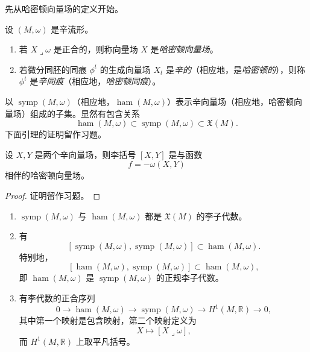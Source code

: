 先从哈密顿向量场的定义开始。

\begin{definition}
\label{def:hamiltonian-vector-field-isotopy}
设 $(M,\omega)$ 是辛流形。
\begin{enumerate}[label=(\arabic*)]
  \item 若 $X\mathbin{\lrcorner}\omega$ 是正合的，则称向量场 $X$ 是\emph{哈密顿向量场}。
  \item 若微分同胚的同痕 $\phi^t$ 的生成向量场 $X_t$ 是\emph{辛的}（相应地，是\emph{哈密顿的}），则称 $\phi^t$ 是\emph{辛同痕}（相应地，\emph{哈密顿同痕}）。
\end{enumerate}
\end{definition}

以 $\operatorname{symp}(M,\omega)$（相应地，$\operatorname{ham}(M,\omega)$）表示辛向量场（相应地，哈密顿向量场）组成的子集。显然有包含关系
\[
  \operatorname{ham}(M,\omega)
  \subset\operatorname{symp}(M,\omega)
  \subset\mathfrak X(M).
\]
下面引理的证明留作习题。

\begin{lemma}
\label{lem:bracket-symplectic-fields-hamiltonian}
设 $X,Y$ 是两个辛向量场，则李括号 $[X,Y]$ 是与函数
\[
  f=-\omega(X,Y)
\]
相伴的哈密顿向量场。
\end{lemma}

\begin{proof}
证明留作习题。
\end{proof}

\begin{proposition}
\label{prop:symp-ham-lie-algebras}
\begin{enumerate}[label=(\arabic*)]
  \item $\operatorname{symp}(M,\omega)$ 与 $\operatorname{ham}(M,\omega)$ 都是 $\mathfrak X(M)$ 的李子代数。
  \item 有
  \[
    [\operatorname{symp}(M,\omega),\operatorname{symp}(M,\omega)]
    \subset\operatorname{ham}(M,\omega).
  \]
  特别地，
  \[
    [\operatorname{ham}(M,\omega),\operatorname{symp}(M,\omega)]
    \subset\operatorname{ham}(M,\omega),
  \]
  即 $\operatorname{ham}(M,\omega)$ 是 $\operatorname{symp}(M,\omega)$ 的正规李子代数。
  \item 有李代数的正合序列
  \[
    0\longrightarrow\operatorname{ham}(M,\omega)
    \longrightarrow\operatorname{symp}(M,\omega)
    \longrightarrow H^1(M,\mathbb R)\longrightarrow0,
  \]
  其中第一个映射是包含映射，第二个映射定义为
  \[
    X\longmapsto[X\mathbin{\lrcorner}\omega],
  \]
  而 $H^1(M,\mathbb R)$ 上取平凡括号。
\end{enumerate}
\end{proposition}


